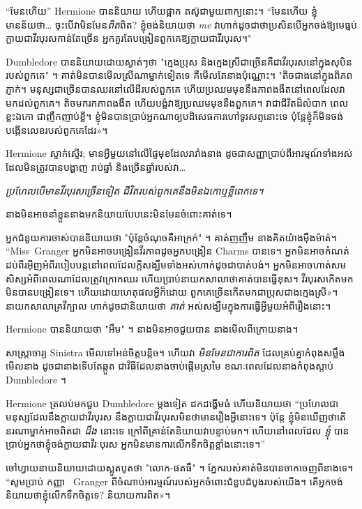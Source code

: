 “មែនហើយ” Hermione បាននិយាយ ហើយផ្អាក តស៊ូជាមួយពាក្យនោះ។ “មែនហើយ ខ្ញុំមានន័យថា… ចុះបើវាមិនមែន\emph{ពិត}ពិត? ខ្ញុំចង់និយាយថា \emph{me} វាហាក់ដូចជាថាប្រសិនបើអ្នកចង់ឱ្យមេធ្មប់ក្លាយជាវីរបុរសកាន់តែច្រើន អ្នកគួរតែបង្រៀនពួកគេឱ្យក្លាយជាវីរបុរស។"

Dumbledore បាននិយាយដោយស្ងាត់ៗថា "ក្មេងប្រុស និងក្មេងស្រីជាច្រើនគឺជាវីរបុរសនៅក្នុងសុបិនរបស់ពួកគេ" ។ គាត់​មិន​បាន​មើល​ស្រី​ណា​ម្នាក់​ទៀត​ទេ គឺ​មើល​តែ​នាង​ប៉ុណ្ណោះ។ "តិចជាងនៅក្នុងពិភពភ្ញាក់។ មនុស្សជាច្រើនបានឈរនៅលើដីរបស់ពួកគេ ហើយប្រឈមមុខនឹងភាពងងឹតនៅពេលដែលវាមកដល់ពួកគេ។ តិចមករកភាពងងឹត ហើយបង្ខំវាឱ្យប្រឈមមុខនឹងពួកគេ។ វាជាជីវិតដ៏លំបាក ពេលខ្លះឯកោ ជាញឹកញាប់ខ្លី។ ខ្ញុំ​មិន​បាន​ប្រាប់​អ្នក​ណា​ឲ្យ​បដិសេធ​ការ​ហៅ​ទូរសព្ទ​នោះ​ទេ ប៉ុន្តែ​ខ្ញុំ​ក៏​មិន​ចង់​បង្កើន​លេខ​របស់​ពួកគេ​ដែរ»។

Hermione ស្ទាក់ស្ទើរ; មាន​អ្វី​មួយ​នៅ​លើ​ផ្ទៃ​មុខ​ដែល​រារាំង​នាង ដូច​ជា​សញ្ញា​ប្រាប់​ពី​អារម្មណ៍​ទាំង​អស់​ដែល​មិន​ត្រូវ​បាន​បង្ហាញ រាប់​ឆ្នាំ និង​ច្រើន​ឆ្នាំ​របស់​វា…

\emph{ប្រហែល​បើ​មាន​វីរបុរស​ច្រើន​ទៀត ជីវិត​របស់​ពួក​គេ​នឹង​មិន​ឯកោ​ឬ​ខ្លី​ពេក​ទេ។}

នាង​មិន​អាច​នាំ​ខ្លួន​នាង​មក​និយាយ​បែប​នេះ​មិន​មែន​ចំពោះ​គាត់​ទេ។

អ្នកជំនួយការចាស់បាននិយាយថា "ប៉ុន្តែចំណុចគឺអាក្រក់" ។ គាត់ញញឹម នាងគិតយ៉ាងម៉ឺងម៉ាត់។ “Miss~Granger អ្នកមិនអាចបង្រៀនវីរភាពដូចអ្នកបង្រៀន Charms បានទេ។ អ្នក​មិន​អាច​កំណត់​ដប់ពីរ​អ៊ីញ​អំពី​របៀប​បន្ត​នៅ​ពេល​ដែល​ក្តី​សង្ឃឹម​ទាំង​អស់​ហាក់​ដូច​ជា​បាត់​បង់។ អ្នក​មិន​អាច​ហាត់​សម​សិស្ស​អំពី​ពេល​ណា​ដែល​ត្រូវ​ក្រោក​ឈរ ហើយ​ប្រាប់​នាយក​សាលា​ថា​គាត់​បាន​ធ្វើ​ខុស។ វីរបុរសកើតមក មិនបានបង្រៀនទេ។ ហើយ​ដោយ​ហេតុផល​អ្វី​ក៏ដោយ ពួកគេ​ច្រើន​កើត​មក​ជា​ប្រុស​ជាង​ក្មេងស្រី​»​។ នាយកសាលាគ្រវីក្បាល ហាក់ដូចជានិយាយថា \emph{គាត់} អស់សង្ឃឹមក្នុងការធ្វើអ្វីមួយអំពីរឿងនោះ។

Hermione បាននិយាយថា "អឹម" ។ នាង​មិន​អាច​ជួយ​បាន នាង​មើល​ពី​ក្រោយ​នាង។

សាស្រ្តាចារ្យ Sinistra មើល​ទៅ​អន់​ចិត្ត​បន្តិច។ ហើយវា \emph{ មិនមែនជាការពិត } ដែលគ្រប់គ្នាកំពុងសម្លឹងមើលនាង ដូចជានាងទើបតែឆ្កួត ជាវិធីដែលនាងចាប់ផ្តើមស្រមៃ ខណៈពេលដែលនាងកំពុងស្តាប់ Dumbledore ។

Hermione ត្រលប់មកជួប Dumbledore ម្តងទៀត ដកដង្ហើមធំ ហើយនិយាយថា “ប្រហែលជាមនុស្សដែលនឹងក្លាយជាវីរបុរស នឹងក្លាយជាវីរបុរសមិនថាមានរឿងអ្វីនោះទេ។ ប៉ុន្តែ ខ្ញុំ​មិន​ឃើញ​ថា​តើ​នរណា​ម្នាក់​អាច​ពិត​ជា \emph{ដឹង} នោះ​ទេ ក្រៅ​ពី​គ្រាន់តែ​និយាយ​វា​បន្ទាប់​មក។ ហើយនៅពេលដែល \emph{ខ្ញុំ} បានប្រាប់អ្នកថាខ្ញុំចង់ក្លាយជាវីរៈបុរស អ្នកមិនមានការលើកទឹកចិត្តខ្លាំងនោះទេ។”

ចៅហ្វាយនាយនិយាយដោយស្លូតបូតថា "លោក-ផតធឺ" ។ ភ្នែករបស់គាត់មិនបានចាកចេញពីនាងទេ។ “សូមប្រាប់ កញ្ញា ~Granger ពីចំណាប់អារម្មណ៍របស់អ្នកចំពោះជំនួបដំបូងរបស់យើង។ តើអ្នកចង់និយាយថាខ្ញុំលើកទឹកចិត្តទេ? និយាយការពិត»។


